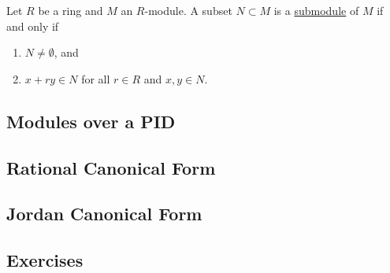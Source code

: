   \begin{theorem}
    \label{thm:submodule-criterion}
    Let $R$ be a ring and $M$ an $R$-module. A subset $N \subset M$ is a \hyperref[def:submodule]{submodule} of $M$ if and only if 
    \begin{enumerate}
      \item $N \neq \emptyset$, and 
      \item $x + ry \in N$ for all $r \in R$ and $x, y \in N$. 
    \end{enumerate}
  \end{theorem}

\subsection{Modules over a PID} 

\subsection{Rational Canonical Form}

\subsection{Jordan Canonical Form}

\subsection{Exercises}
